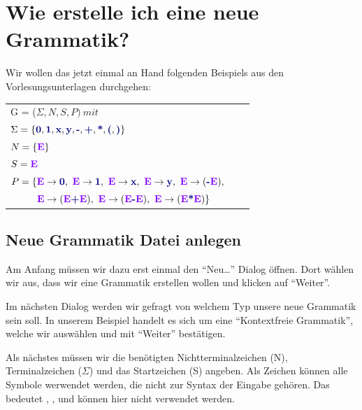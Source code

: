\chapter{Wie erstelle ich eine neue Grammatik?}\label{Grammar}

Wir wollen das jetzt einmal an Hand folgenden Beispiels aus den
Vorlesungsunterlagen durchgehen:\vspace{10pt}


\begin{tabular}{lcr}
G = ($\Sigma, N, S, P )\ mit $\\
	$\Sigma = \{\TerminalSymbol{0}, \TerminalSymbol{1}, \TerminalSymbol{x},
	\TerminalSymbol{y}, \TerminalSymbol{-}, \TerminalSymbol{+},
	\TerminalSymbol{*}, \TerminalSymbol{(}, \TerminalSymbol{)}\}$\\ $N =
	\{\StartSymbol{E}\}$\\ $S=\StartSymbol{E}$\\ 
	$P = \{\StartSymbol{E} \to \TerminalSymbol{0},\ \StartSymbol{E} \to \TerminalSymbol{1},\ 
	\StartSymbol{E}	\to \TerminalSymbol{x},\ \StartSymbol{E} \to \TerminalSymbol{y},\ 
	\StartSymbol{E} \to (\TerminalSymbol{-}\StartSymbol{E}),$\\ 
	$\ \ \ \ \ \ \ \ \StartSymbol{E} \to (\StartSymbol{E} \TerminalSymbol{+}
	\StartSymbol{E}),\ \StartSymbol{E} \to (\StartSymbol{E} \TerminalSymbol{-} \StartSymbol{E}),\
	\StartSymbol{E} \to (\StartSymbol{E} \TerminalSymbol{*} \StartSymbol{E})\}$\\
\end{tabular}

\section{Neue Grammatik Datei anlegen}
 
Am Anfang müssen wir dazu erst einmal den "`Neu\ldots"' Dialog öffnen. Dort
wählen wir aus, dass wir eine Grammatik erstellen wollen und klicken auf
"`Weiter"'.\vspace{10pt}

Im nächsten Dialog werden wir gefragt von welchem Typ unsere neue Grammatik
sein soll. In unserem Beispiel handelt es sich um eine "`Kontextfreie
Grammatik"', welche wir auswählen und mit "`Weiter"' bestätigen.\vspace{10pt}

Als nächstes müssen wir die benötigten Nichtterminalzeichen (N),
Terminalzeichen ($\Sigma$) und das Startzeichen (S) angeben.  Als Zeichen
können alle Symbole werwendet werden, die nicht zur Syntax der Eingabe gehören.
Das bedeutet \Symbol{,}, \Symbol{\{}, \Symbol{\}} und \SymbolEmpty{}
können hier nicht verwendet werden.\vspace{10pt}

